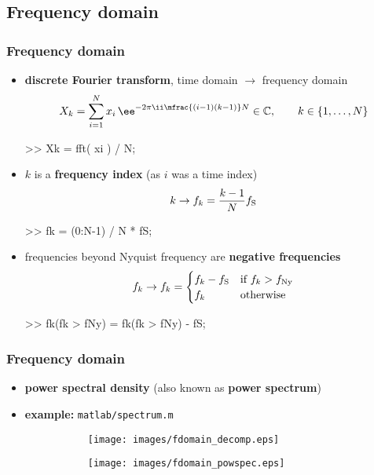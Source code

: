 
\subsection{Frequency domain}

\begin{frame}[fragile]
	\frametitle{Frequency domain}
	\begin{itemize}
		\item \textbf{discrete Fourier transform}, time domain $\rightarrow$ frequency domain
			\begin{align*}
				X_k=\sum_{i=1}^Nx_i\,\ee^{-2\pi\ii\mfrac{(i-1)(k-1)}N}\in\mathbb C,\qquad k\in\{1,\ldots,N\}
			\end{align*}
			\begin{code}
>> Xk = fft( xi ) / N; \color[medium]%
			\end{code}
		\item $k$ is a \textbf{frequency index} (as $i$ was a time index)
			\begin{align*}
				k\rightarrow f_k=\frac{k-1}Nf_{\textrm S}
			\end{align*}
			\begin{code}
>> fk = (0:N-1) / N * fS; \color[medium]%
			\end{code}
		\item frequencies beyond Nyquist frequency are \textbf{negative frequencies}
			\begin{align*}
				f_k\rightarrow f_k=\begin{cases}f_k-f_{\textrm S}&\textrm{if $f_k>f_{\textrm{Ny}}$}\\f_k&\textrm{otherwise}\end{cases}
			\end{align*}
			\begin{code}
>> fk(fk > fNy) = fk(fk > fNy) - fS; \color[medium]%
			\end{code}
	\end{itemize}
\end{frame}

\begin{frame}[fragile]
	\frametitle{Frequency domain}
	\begin{itemize}
		\item \textbf{power spectral density} (also known as \textbf{power spectrum})
		\item \textbf{example: }\texttt{matlab/spectrum.m}
			\begin{figure}
				\centering
				\begin{subfigure}[t]{0.48\linewidth}
					\texttt{[image: images/fdomain\_decomp.eps]}
				\end{subfigure}
				\hspace{0.01\linewidth}
				\begin{subfigure}[t]{0.48\linewidth}
					\texttt{[image: images/fdomain\_powspec.eps]}
				\end{subfigure}
			\end{figure}
	\end{itemize}
\end{frame}

